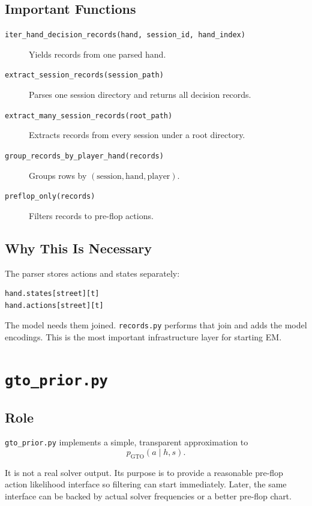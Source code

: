 \documentclass[11pt]{article}
\begin{document}
\subsection{Important Functions}

\begin{description}
  \item[\texttt{iter\_hand\_decision\_records(hand, session\_id, hand\_index)}]
  Yields records from one parsed hand.
  \item[\texttt{extract\_session\_records(session\_path)}] Parses one session
  directory and returns all decision records.
  \item[\texttt{extract\_many\_session\_records(root\_path)}] Extracts records
  from every session under a root directory.
  \item[\texttt{group\_records\_by\_player\_hand(records)}] Groups rows by
  \((\text{session}, \text{hand}, \text{player})\).
  \item[\texttt{preflop\_only(records)}] Filters records to pre-flop actions.
\end{description}

\subsection{Why This Is Necessary}

The parser stores actions and states separately:

\begin{lstlisting}[language=Python]
hand.states[street][t]
hand.actions[street][t]
\end{lstlisting}

The model needs them joined. \texttt{records.py} performs that join and adds the
model encodings. This is the most important infrastructure layer for starting
EM.

\section{\texttt{gto\_prior.py}}

\subsection{Role}

\texttt{gto\_prior.py} implements a simple, transparent approximation to
\[
p_{\mathrm{GTO}}(a \mid h,s).
\]

It is not a real solver output. Its purpose is to provide a reasonable
pre-flop action likelihood interface so filtering can start immediately. Later,
the same interface can be backed by actual solver frequencies or a better
pre-flop chart.
\end{document}
